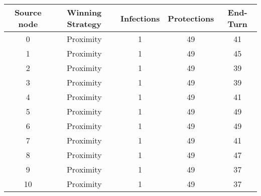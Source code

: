 \documentclass[results.tex]{subfiles}
\begin{document}
    \begin{center}
        \begin{tabular}{| c || c | c | c | c |}
            \hline
            {\bfseries Source node} & {\bfseries Winning Strategy} & {\bfseries Infections} & {\bfseries Protections}
            & {\bfseries End-Turn}
            \\  %
            \hline\hline
            0                       & Proximity                    & 1                      & 49                      & 41                   \\
            \hline
            1                       & Proximity                    & 1                      & 49                      & 45                   \\
            \hline
            2                       & Proximity                    & 1                      & 49                      & 39                   \\
            \hline
            3                       & Proximity                    & 1                      & 49                      & 39                   \\
            \hline
            4                       & Proximity                    & 1                      & 49                      & 41                   \\
            \hline
            5                       & Proximity                    & 1                      & 49                      & 49                   \\
            \hline
            6                       & Proximity                    & 1                      & 49                      & 49                   \\
            \hline
            7                       & Proximity                    & 1                      & 49                      & 41                   \\
            \hline
            8                       & Proximity                    & 1                      & 49                      & 47                   \\
            \hline
            9                       & Proximity                    & 1                      & 49                      & 37                   \\
            \hline
            10                      & Proximity                    & 1                      & 49                      & 37                   \\

\end{tabular}
\end{center}
\end{document}
